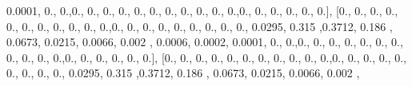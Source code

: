 \documentclass[
]{book}
\newenvironment{Shaded}{\begin{snugshade}}{\end{snugshade}}
\newcommand{\FloatTok}[1]{\textcolor[rgb]{0.00,0.00,0.81}{#1}}
\newcommand{\NormalTok}[1]{#1}
\begin{document}
\begin{Shaded}
\begin{Highlighting}[]
\FloatTok{0.0001}\NormalTok{, }\FloatTok{0.}\NormalTok{, }\FloatTok{0.}\NormalTok{,}\FloatTok{0.}\NormalTok{, }\FloatTok{0.}\NormalTok{, }\FloatTok{0.}\NormalTok{, }\FloatTok{0.}\NormalTok{, }\FloatTok{0.}\NormalTok{, }\FloatTok{0.}\NormalTok{, }\FloatTok{0.}\NormalTok{, }\FloatTok{0.}\NormalTok{, }\FloatTok{0.}\NormalTok{, }\FloatTok{0.}\NormalTok{, }\FloatTok{0.}\NormalTok{,}\FloatTok{0.}\NormalTok{, }\FloatTok{0.}\NormalTok{, }\FloatTok{0.}\NormalTok{, }\FloatTok{0.}\NormalTok{, }\FloatTok{0.}\NormalTok{,}
\FloatTok{0.}\NormalTok{], [}\FloatTok{0.}\NormalTok{, }\FloatTok{0.}\NormalTok{, }\FloatTok{0.}\NormalTok{, }\FloatTok{0.}\NormalTok{, }\FloatTok{0.}\NormalTok{, }\FloatTok{0.}\NormalTok{, }\FloatTok{0.}\NormalTok{, }\FloatTok{0.}\NormalTok{, }\FloatTok{0.}\NormalTok{, }\FloatTok{0.}\NormalTok{, }\FloatTok{0.}\NormalTok{,}\FloatTok{0.}\NormalTok{, }\FloatTok{0.}\NormalTok{, }\FloatTok{0.}\NormalTok{, }\FloatTok{0.}\NormalTok{, }\FloatTok{0.}\NormalTok{, }\FloatTok{0.}\NormalTok{, }\FloatTok{0.}\NormalTok{, }\FloatTok{0.}\NormalTok{,}
\FloatTok{0.}\NormalTok{, }\FloatTok{0.0295}\NormalTok{, }\FloatTok{0.315}\NormalTok{ ,}\FloatTok{0.3712}\NormalTok{, }\FloatTok{0.186}\NormalTok{ , }\FloatTok{0.0673}\NormalTok{, }\FloatTok{0.0215}\NormalTok{, }\FloatTok{0.0066}\NormalTok{, }\FloatTok{0.002}\NormalTok{ , }\FloatTok{0.0006}\NormalTok{,}
\FloatTok{0.0002}\NormalTok{, }\FloatTok{0.0001}\NormalTok{, }\FloatTok{0.}\NormalTok{, }\FloatTok{0.}\NormalTok{,}\FloatTok{0.}\NormalTok{, }\FloatTok{0.}\NormalTok{, }\FloatTok{0.}\NormalTok{, }\FloatTok{0.}\NormalTok{, }\FloatTok{0.}\NormalTok{, }\FloatTok{0.}\NormalTok{, }\FloatTok{0.}\NormalTok{, }\FloatTok{0.}\NormalTok{, }\FloatTok{0.}\NormalTok{, }\FloatTok{0.}\NormalTok{, }\FloatTok{0.}\NormalTok{,}\FloatTok{0.}\NormalTok{, }\FloatTok{0.}\NormalTok{, }\FloatTok{0.}\NormalTok{,}
\FloatTok{0.}\NormalTok{, }\FloatTok{0.}\NormalTok{, }\FloatTok{0.}\NormalTok{], [}\FloatTok{0.}\NormalTok{, }\FloatTok{0.}\NormalTok{, }\FloatTok{0.}\NormalTok{, }\FloatTok{0.}\NormalTok{, }\FloatTok{0.}\NormalTok{, }\FloatTok{0.}\NormalTok{, }\FloatTok{0.}\NormalTok{, }\FloatTok{0.}\NormalTok{, }\FloatTok{0.}\NormalTok{, }\FloatTok{0.}\NormalTok{, }\FloatTok{0.}\NormalTok{,}\FloatTok{0.}\NormalTok{, }\FloatTok{0.}\NormalTok{, }\FloatTok{0.}\NormalTok{, }\FloatTok{0.}\NormalTok{, }\FloatTok{0.}\NormalTok{, }\FloatTok{0.}\NormalTok{,}
\FloatTok{0.}\NormalTok{, }\FloatTok{0.}\NormalTok{, }\FloatTok{0.}\NormalTok{, }\FloatTok{0.0295}\NormalTok{, }\FloatTok{0.315}\NormalTok{ ,}\FloatTok{0.3712}\NormalTok{, }\FloatTok{0.186}\NormalTok{ , }\FloatTok{0.0673}\NormalTok{, }\FloatTok{0.0215}\NormalTok{, }\FloatTok{0.0066}\NormalTok{, }\FloatTok{0.002}\NormalTok{ ,}

\end{Highlighting}
\end{Shaded}
\end{document}
